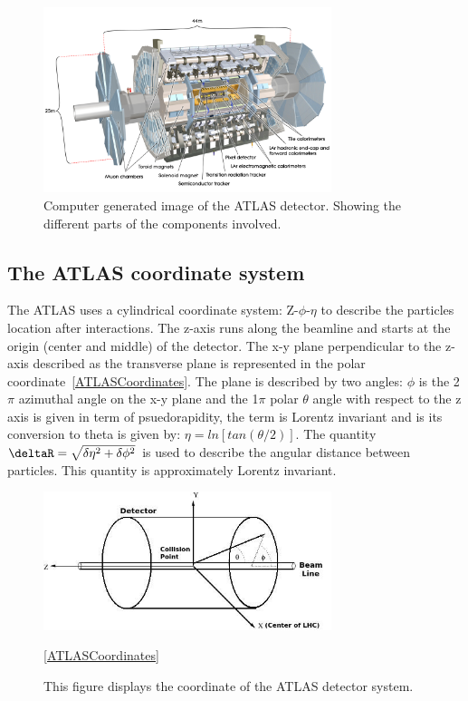 \begin{figure}[!htb]
    \begin{center}
        \includegraphics[width=0.75\textwidth]{figures/chapter_ATLAS/ATLASDetector}
        \caption{
			Computer generated image of the ATLAS detector\cite{Pequenao:1095924}. Showing the different parts of the components involved. 
        }
        \label{fig:ATLASDectector}
    \end{center}
\end{figure}


\subsection*{The ATLAS coordinate system}

The ATLAS uses a cylindrical coordinate system: Z-$\phi$-$\eta$ to describe the particles location after interactions.
The z-axis runs along the beamline and starts at the origin (center and middle) of the detector. The x-y plane perpendicular to the z-axis described as the transverse plane is represented in the polar coordinate~\ref{ATLASCoordinates}. The plane is described by two angles: $\phi$ is the 2$\pi$ azimuthal angle on the x-y plane and the 1$\pi$ polar $\theta$ angle with respect to the z axis is given in term of psuedorapidity, the term is Lorentz invariant and is its conversion to theta is
given by: $\eta=ln[tan(\theta/2)]$. The quantity $\deltaR=\sqrt{\delta\eta^{2}+
\delta\phi^{2}} $ is used to describe the angular distance between particles. This quantity is approximately Lorentz invariant. 

\begin{figure}[!htb]
    \begin{center}
        \includegraphics[width=0.75\textwidth]{figures/chapter_ATLAS/Coordinates}
        \caption{
			This figure displays the coordinate of the ATLAS detector system. \cite{2008} 
        }
        \label{fig:Coordinates}
        \ref{ATLASCoordinates}
    \end{center}
\end{figure}

